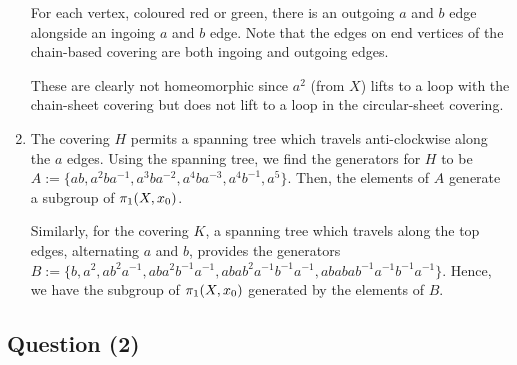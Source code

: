\documentclass{article}
\begin{document}
\begin{flushleft}
\begin{enumerate}[label=\alph*)]
		For each vertex, coloured red or green, there is an outgoing $a$ and $b$ edge alongside an ingoing $a$ and $b$ edge. Note that the edges on end vertices of the chain-based covering are both ingoing and outgoing edges.
		
		These are clearly not homeomorphic since $a^2$ (from $X$) lifts to a loop with the chain-sheet covering but does not lift to a loop in the circular-sheet covering.
		
		\item The covering $H$ permits a spanning tree which travels anti-clockwise along the $a$ edges. Using the spanning tree, we find the generators for $H$ to be $A := \{ab, a^2ba^{-1}, a^3ba^{-2}, a^4ba^{-3}, a^4b^{-1}, a^5\}$. Then, the elements of $A$ generate a subgroup of $\pi_1(X, x_0)$.
		
		Similarly, for the covering $K$, a spanning tree which travels along the top edges, alternating $a$ and $b$, provides the generators $B := \{b, a^2, ab^2a^{-1}, aba^2b^{-1}a^{-1}, abab^2a^{-1}b^{-1}a^{-1}, ababab^{-1}a^{-1}b^{-1}a^{-1}\}$. Hence, we have the subgroup of $\pi_1(X, x_0)$ generated by the elements of $B$.
	\end{enumerate}
\end{flushleft}
\begin{center}
    \section*{Question (2)}
\end{center}
\end{document}
